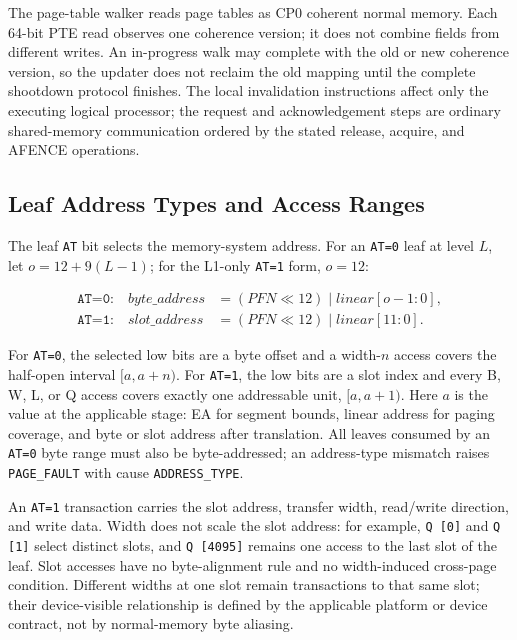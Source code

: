 The page-table walker reads page tables as CP0 coherent normal memory. Each 64-bit PTE read observes one coherence
version; it does not combine fields from different writes. An in-progress walk may complete with the old or new
coherence version, so the updater does not reclaim the old mapping until the complete shootdown protocol finishes.
The local invalidation instructions affect only the executing logical processor; the request and acknowledgement
steps are ordinary shared-memory communication ordered by the stated release, acquire, and AFENCE operations.

\subsection{Leaf Address Types and Access Ranges}
The leaf \texttt{AT} bit selects the memory-system address. For an \texttt{AT=0} leaf at level $L$, let
$o=12+9(L-1)$; for the L1-only \texttt{AT=1} form, $o=12$:

\[
\begin{aligned}
\texttt{AT=0:}\quad \mathit{byte\_address} &= (\mathit{PFN}\ll12)\mathbin{|}\mathit{linear}[o-1:0],\\
\texttt{AT=1:}\quad \mathit{slot\_address} &= (\mathit{PFN}\ll12)\mathbin{|}\mathit{linear}[11:0].
\end{aligned}
\]

For \texttt{AT=0}, the selected low bits are a byte offset and a width-$n$ access covers the half-open interval
$[a,a+n)$. For \texttt{AT=1}, the low bits are a slot index and every B, W, L, or Q access covers exactly one
addressable unit, $[a,a+1)$. Here $a$ is the value at the applicable stage: EA for segment bounds, linear address
for paging coverage, and byte or slot address after translation. All leaves consumed by an \texttt{AT=0} byte range
must also be byte-addressed; an address-type mismatch raises \texttt{PAGE\_FAULT} with cause
\texttt{ADDRESS\_TYPE}.

An \texttt{AT=1} transaction carries the slot address, transfer width, read/write direction, and write data. Width
does not scale the slot address: for example, \texttt{Q [0]} and \texttt{Q [1]} select distinct slots, and
\texttt{Q [4095]} remains one access to the last slot of the leaf. Slot accesses have no byte-alignment rule and no
width-induced cross-page condition. Different widths at one slot remain transactions to that same slot; their
device-visible relationship is defined by the applicable platform or device contract, not by normal-memory byte
aliasing.

